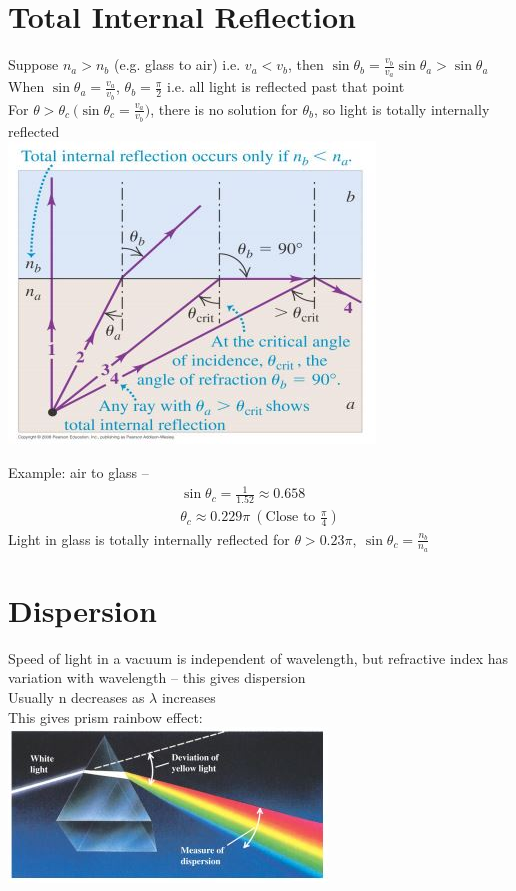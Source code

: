 \documentclass[a4paper, 11pt, fleqn, normalem]{report}
\begin{document}
\section{Total Internal Reflection}
Suppose $n_{a} > n_{b}$ (e.g. glass to air) i.e. $v_{a} < v_{b}$, then $\sin{\theta_{b}} = \frac{v_{b}}{v_{a}}\sin{\theta_{a}} > \sin{\theta_{a}}$ \\
When $\sin{\theta_{a}} = \frac{v_{a}}{v_{b}}$, $\theta_{b} = \frac{\pi}{2}$ i.e. all light is reflected past that point \\
For $\theta > \theta_{c} ~\big(\sin{\theta_{c}} = \frac{v_{a}}{v_{b}}\big)$, there is no solution for $\theta_{b}$, so light is totally internally reflected \\
\includegraphics[scale=0.8]{TIR.jpg}

Example: air to glass --
\begin{gather*}
    \sin{\theta_{c}} = \frac{1}{1.52} \approx 0.658 \\
    \theta_{c} \approx 0.229\pi~(\text{Close to }\frac{\pi}{4})
\end{gather*}
Light in glass is totally internally reflected for $\theta > 0.23\pi,~\sin{\theta_{c}} = \frac{n_{b}}{n_{a}}$

\section{Dispersion}
Speed of light in a vacuum is independent of wavelength, but refractive index has variation with wavelength -- this gives dispersion \\
Usually n decreases as $\lambda$ increases \\
This gives prism rainbow effect: \\
\includegraphics[scale=0.8]{PF.jpg}
\end{document}
